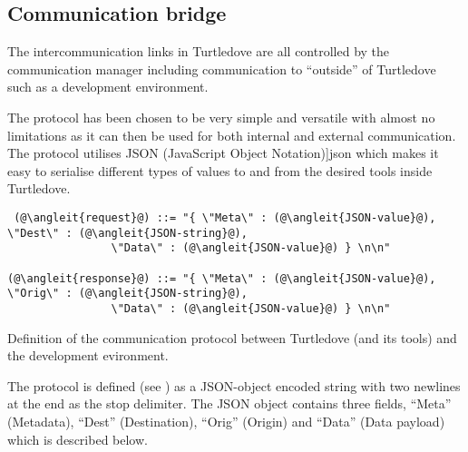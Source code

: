 \subsection{Communication bridge}

The intercommunication links in Turtledove are all controlled by the
communication manager including communication to ``outside'' of Turtledove such
as a development environment. 

\def \protocoljson {\Fref[plain]{fig:protocol-json}}

The protocol has been chosen to be very simple and versatile with almost no
limitations as it can then be used for both internal and external
communication. The protocol utilises JSON (JavaScript Object
Notation)\cite[\protocoljson]{json} which makes it easy to serialise different types of values
to and from the desired tools inside Turtledove.


\begin{nonfloatingfigure}
{ %
  \newcommand{\angleit}[1]{$\langle$\textnormal{\textit{#1}}$\rangle$}
\begin{lstlisting}
 (@\angleit{request}@) ::= "{ \"Meta\" : (@\angleit{JSON-value}@), \"Dest\" : (@\angleit{JSON-string}@),
                \"Data\" : (@\angleit{JSON-value}@) } \n\n"

(@\angleit{response}@) ::= "{ \"Meta\" : (@\angleit{JSON-value}@), \"Orig\" : (@\angleit{JSON-string}@),
                \"Data\" : (@\angleit{JSON-value}@) } \n\n"
\end{lstlisting}    
}
  
  \caption{Definition of the communication protocol between Turtledove (and its
    tools) and the development evironment.}
  \label{fig:intercom-protocol-def}
\end{nonfloatingfigure}


The protocol is defined (see ) as a JSON-object
encoded string with two newlines at the end as the stop delimiter. The JSON
object contains three fields, ``Meta'' (Metadata), ``Dest'' (Destination),
``Orig'' (Origin) and ``Data'' (Data payload) which is described below.

